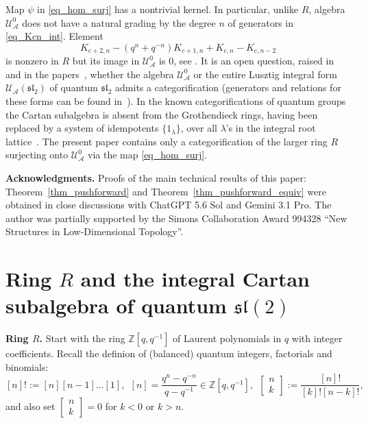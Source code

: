 \documentclass{article}
\def\mf{\mathfrak}
\def\Z{\mathbb Z}
\newcommand{\mcA}{\mathcal{A}}
\newcommand{\UzeroA}{\mathcal{U}^0_{\mcA}}
\newcommand{\bbinom}[2]{
  \begin{bmatrix}
    #1 \\
    #2
  \end{bmatrix}
}
\theoremstyle{definition}
\theoremstyle{definition}
\begin{document}
\vspace{0.07in}


 Map $\psi$ in \eqref{eq_hom_surj} has a nontrivial kernel. In particular, unlike $R$, algebra $\UzeroA$ does not have a natural grading by the degree $n$ of generators in \eqref{eq_Kcn_int}. Element
 \begin{equation}\label{eq_kernel_el}
 K_{c+2,n}-(q^n+q^{-n})K_{c+1,n}+K_{c,n}-K_{c,n-2}
 \end{equation}
 is nonzero in $R$ but its image in $\UzeroA$ is $0$, see \cite[Proposition 6.1]{GMSW1}. It is an open question, raised in~\cite{MartinezRuiz2025} and in the  papers~\cite{GMSW1,GMSW2,GMSW3}, whether the algebra $\UzeroA$ or the entire Lusztig integral form $\mathcal{U}_{\mcA}(\mf{sl}_2)$ of quantum $\mf{sl}_2$ admits a categorification (generators and relations for these forms can be found in~\cite{Lusztig2}). In the known categorifications of quantum groups~\cite{Lauda,KhLau,Rouquier1,Rouquier2}  the Cartan subalgebra is absent from the Grothendieck rings, having been replaced by a system of idempotents $\{1_{\lambda}\}$, over all  $\lambda$'s in the integral root lattice~\cite{LusztigBook}. The present paper  contains only a categorification of the larger ring $R$ surjecting onto $\UzeroA$ via the map \eqref{eq_hom_surj}.

\vspace{0.07in}


 {\bf Acknowledgments.}
 Proofs of the main technical results of this paper: Theorem~\ref{thm_pushforward} and Theorem~\ref{thm_pushforward_equiv}  were obtained in close discussions with ChatGPT 5.6 Sol and Gemini 3.1 Pro. The author was partially supported by the Simons Collaboration Award 994328 ``New Structures in Low-Dimensional Topology''.

%
%

\section{Ring \texorpdfstring{$R$}{R} and  the integral Cartan subalgebra of quantum \texorpdfstring{$\mathfrak{sl}(2)$}{sl(2)}}
\label{sec_integral}

{\bf Ring $R$.}
Start with the ring $\Z[q,q^{-1}]$
of Laurent polynomials in $q$ with integer coefficients. Recall the definion of (balanced) quantum integers, factorials and binomials:
\begin{equation}\label{eq_balanced}
[n]! :=[n][n-1]\dots [1], \ \ [n]=\frac{q^n-q^{-n}}{q-q^{-1}}\in \Z[q,q^{-1}], \ \
\bbinom{n}{k}:=\frac{[n]!}{[k]![n-k]!},
\end{equation}
and also set
$\begin{bmatrix} n \\ k \end{bmatrix}=0$ for $k<0$ or $k>n$.
\end{document}
